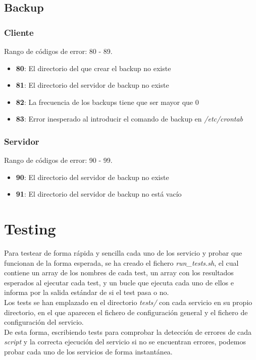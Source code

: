 \documentclass[12pt,a4paper, spanish]{article}
\begin{document}
\subsection{Backup}

\subsubsection{Cliente}
Rango de códigos de error: 80 - 89.
\begin{itemize}
\item \textbf{80}: El directorio del que crear el backup no existe
\item \textbf{81}: El directorio del servidor de backup no existe
\item \textbf{82}: La frecuencia de los backups tiene que ser mayor que 0
\item \textbf{83}: Error inesperado al introducir el comando de backup en \textit{/etc/crontab}
\end{itemize}

\subsubsection{Servidor}
Rango de códigos de error: 90 - 99.
\begin{itemize}
\item \textbf{90}: El directorio del servidor de backup no existe
\item \textbf{91}: El directorio del servidor de backup no está vacío
\end{itemize}

\newpage
\section{Testing}
\noindent Para testear de forma rápida y sencilla cada uno de los servicio y probar que funcionan de la forma esperada, se ha creado el fichero \textit{run\_tests.sh}, el cual contiene un array de los nombres de cada test, un array con los resultados esperados al ejecutar cada test, y un bucle que ejecuta cada uno de ellos e informa por la salida estándar de si el test pasa o no.\\

Los tests se han emplazado en el directorio \textit{tests/} con cada servicio en su propio directorio, en el que aparecen el fichero de configuración general y el fichero de configuración del servicio.\\

De esta forma, escribiendo tests para comprobar la detección de errores de cada \textit{script} y la correcta ejecución del servicio si no se encuentran errores, podemos probar cada uno de los servicios de forma instantánea.\\
\end{document}
